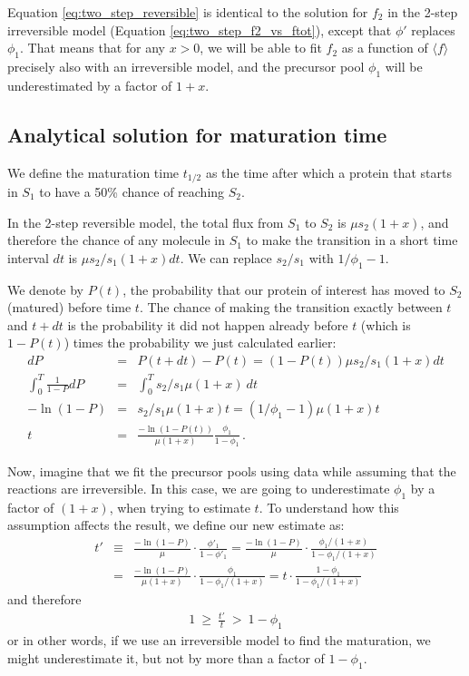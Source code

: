 \documentclass{article}
\newcommand{\fin}{\ensuremath{\langle f \rangle}}
\begin{document}
Equation \ref{eq:two_step_reversible} is identical to the solution for $f_2$ in the 2-step irreversible model (Equation \ref{eq:two_step_f2_vs_ftot}), except that $\phi'$ replaces $\phi_1$. That means that for any $x > 0$, we will be able to fit $f_2$ as a function of $\fin$ precisely also with an irreversible model, and the precursor pool $\phi_1$ will be underestimated by a factor of $1+x$.

\subsection{Analytical solution for maturation time}
We define the maturation time $t_{1/2}$ as the time after which a protein that starts in $S_1$ to have a 50\% chance of reaching $S_2$. 

In the 2-step reversible model, the total flux from $S_1$ to $S_2$ is $\mu s_2 (1+x)$, and therefore the chance of any molecule in $S_1$ to make the transition in a short time interval $dt$ is $\mu s_2/s_1 (1+x) dt$. We can replace $s_2/s_1$ with $1/\phi_1 - 1$.

We denote by $P(t)$, the probability that our protein of interest has moved to $S_2$ (matured) before time $t$. The chance of making the transition exactly between $t$ and $t+dt$ is the probability it did not happen already before $t$ (which is $1 - P(t)$) times the probability we just calculated earlier:
\begin{eqnarray}
    dP &=& P(t + dt) - P(t) = \left(1 - P(t)\right) \mu s_2/s_1 (1+x) dt \\
    \int_0^T \frac{1}{1-P} dP &=& \int_0^T s_2/s_1 \mu (1+x)~dt  \\
    -\ln(1-P) &=& s_2/s_1 \mu (1+x)t = (1/\phi_1 - 1)\mu (1+x)t  \\
    t &=& \frac{-\ln(1-P(t))}{\mu (1+x)} \frac{\phi_1}{1 - \phi_1}\,.
\end{eqnarray}

Now, imagine that we fit the precursor pools using data while assuming that the reactions are irreversible. In this case, we are going to underestimate $\phi_1$ by a factor of $(1+x)$, when trying to estimate $t$. To understand how this assumption affects the result, we define our new estimate as:
\begin{eqnarray}
    t' &\equiv& \frac{-\ln(1-P)}{\mu} \cdot \frac{\phi'_1}{1 - \phi'_1} 
    = \frac{-\ln(1-P)}{\mu} \cdot \frac{\phi_1/(1+x)}{1 - \phi_1/(1+x)} \nonumber\\
    &=& \frac{-\ln(1-P)}{\mu (1+x)} \cdot \frac{\phi_1}{1 - \phi_1/(1+x)} 
    = t \cdot \frac{1 - \phi_1}{1 - \phi_1/(1+x)}
\end{eqnarray}
and therefore
\begin{eqnarray}
    1 ~\geq~ \frac{t'}{t} ~>~ 1-\phi_1
\end{eqnarray}
or in other words, if we use an irreversible model to find the maturation, we might underestimate it, but not by more than a factor of $1-\phi_1$.
\end{document}
